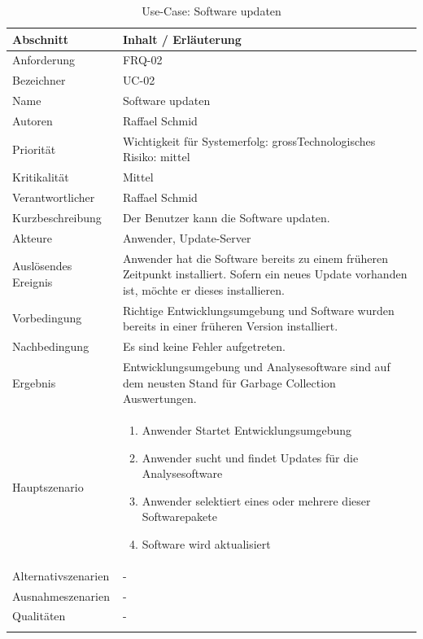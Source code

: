 \begin{longtable}{|p{4cm}|p{10.5cm}|}
\hline
   \textbf{Abschnitt} & \textbf{Inhalt / Erläuterung} \\\hline
   Anforderung & FRQ-02\\\hline
   Bezeichner & UC-02\\\hline
   Name & Software updaten\\\hline
   Autoren & Raffael Schmid\\\hline
   Priorität & Wichtigkeit für Systemerfolg: gross\newline Technologisches Risiko: mittel\\\hline
   Kritikalität & Mittel\\\hline
   Verantwortlicher & Raffael Schmid\\\hline
   Kurzbeschreibung & Der Benutzer kann die Software updaten.\\\hline
   Akteure & Anwender, Update-Server\\\hline   
   Auslösendes Ereignis & Anwender hat die Software bereits zu einem früheren Zeitpunkt installiert. Sofern ein neues Update vorhanden ist, möchte er dieses installieren.\\\hline
   Vorbedingung & Richtige Entwicklungsumgebung und Software wurden bereits in einer früheren Version installiert.\\\hline
   Nachbedingung & Es sind keine Fehler aufgetreten.\\\hline
   Ergebnis & Entwicklungsumgebung und Analysesoftware sind auf dem neusten Stand für Garbage Collection Auswertungen.\\\hline
   Hauptszenario & 
	\begin{enumerate}
		\item Anwender Startet Entwicklungsumgebung
		\item Anwender sucht und findet Updates für die Analysesoftware
		\item Anwender selektiert eines oder mehrere dieser Softwarepakete
		\item Software wird aktualisiert
	\end{enumerate}
	\\\hline
   Alternativszenarien & -\\\hline
   Ausnahmeszenarien & -\\\hline
   Qualitäten & -\\\hline
\caption{Use-Case: Software updaten}
\end{longtable}

